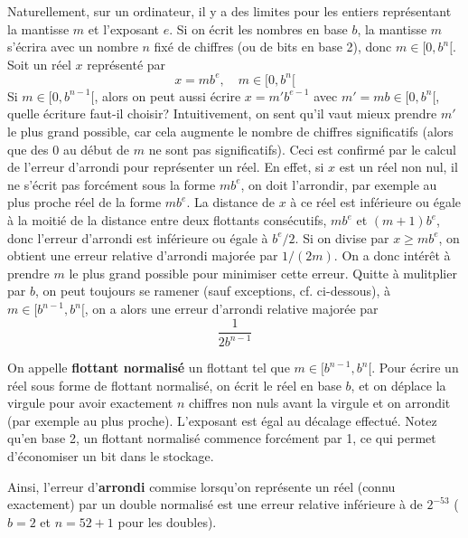 \documentclass[a4paper,11pt]{article}
\begin{document}
\begin{giacjshere}
Naturellement, sur un ordinateur, il y a des limites pour les entiers  
repr\'esentant la mantisse $m$ et l'exposant $e$. 
Si on \'ecrit les nombres en base
$b$, la mantisse $m$ s'\'ecrira avec un nombre $n$ fix\'e de chiffres (ou
de bits en base 2), donc $m \in [0,b^n[$. Soit un r\'eel $x$ repr\'esent\'e
par
\[ x=mb^e, \quad m \in [0,b^n[ \]
Si $m\in [0,b^{n-1}[$, alors on peut aussi \'ecrire $x=m' b^{e-1}$ avec
$m'=mb \in [0,b^n[$, quelle \'ecriture faut-il choisir?
Intuitivement, on sent qu'il vaut mieux prendre $m'$ le plus grand
possible, car cela augmente le nombre de chiffres significatifs (alors
que des 0 au d\'ebut de $m$ ne sont pas significatifs).
Ceci est confirm\'e par le calcul de l'erreur d'arrondi pour
repr\'esenter un r\'eel. En effet, si $x$ est un r\'eel non nul, il ne
s'\'ecrit pas forc\'ement sous la forme $mb^e$, on doit l'arrondir,
par exemple au plus proche r\'eel de la forme $mb^e$. La distance
de $x$ \`a ce r\'eel est inf\'erieure ou \'egale \`a la moiti\'e
de la distance entre deux flottants cons\'ecutifs, 
$mb^e$ et $(m+1)b^e$, donc l'erreur d'arrondi
est inf\'erieure ou \'egale \`a $b^e/2$. Si on divise par $x \geq mb^e$,
on obtient une erreur relative d'arrondi major\'ee par $1/(2m)$.
On a donc int\'er\^et \`a prendre $m$ le plus grand possible pour
minimiser cette erreur. Quitte \`a mulitplier par $b$, on peut
toujours se ramener (sauf exceptions, cf. ci-dessous), 
\`a $m \in [b^{n-1},b^n[$, on a alors
une erreur d'arrondi relative major\'ee par
\[ \frac{1}{2b^{n-1}}\]

On appelle {\bf flottant normalis\'e} un flottant tel que $m \in
[b^{n-1},b^n[$. Pour \'ecrire un r\'eel sous forme de flottant
normalis\'e, on \'ecrit le r\'eel en base $b$, et on d\'eplace
la virgule pour avoir exactement $n$ chiffres non nuls avant la
virgule et on arrondit (par exemple au plus proche). 
L'exposant est \'egal au d\'ecalage effectu\'e.
Notez qu'en base 2, un flottant normalisé commence forcément
par 1, ce qui permet d'économiser un bit dans le stockage.

Ainsi, l'erreur d'{\bf arrondi} commise lorsqu'on
représente un réel (connu exactement) par un double normalis\'e 
est une erreur relative inf\'erieure \`a
de $2^{-53}$ ($b=2$ et $n=52+1$ pour les doubles).


\end{giacjshere}
\end{document}
